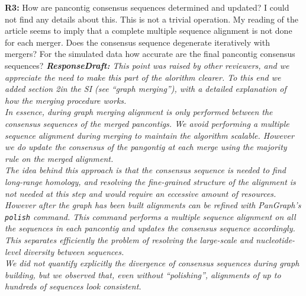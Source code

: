 \documentclass[aps,rmp,onecolumn]{revtex4-1}
\newcommand{\Marco}[1]{{\color{gray}Marco: #1}}
\newcommand{\Liam}[1]{{\color{teal}Liam: #1}}
\newcommand{\reviewer}[2]{\textbf{#1:} #2\vskip 5mm}
\newcommand{\responsedraft}[1]{{\it {\color{purple}\textbf{ResponseDraft:} #1}}\vskip 5mm}
\newcommand{\SIalgo}{2}
\begin{document}
\reviewer{R3}{How are pancontig consensus sequences determined and updated? I could not find any details about this. This is not a trivial operation. My reading of the article seems to imply that a complete multiple sequence alignment is not done for each merger. Does the consensus sequence degenerate iteratively with mergers? For the simulated data how accurate are the final pancontig consensus sequences?}
\responsedraft{This point was raised by other reviewers, and we appreciate the need to make this part of the alorithm clearer. To this end we added section \SIalgo in the SI (see ``graph merging''), with a detailed explanation of how the merging procedure works.\\
      In essence, during graph merging alignment is only performed between the consensus sequences of the merged pancontigs. We avoid performing a multiple sequence alignment during merging to maintain the algorithm scalable. However we do update the consensus of the pangontig at each merge using the majority rule on the merged alignment.\\
      The idea behind this approach is that the consensus sequence is needed to find long-range homology, and resolving the fine-grained structure of the alignment is not needed at this step and would require an eccessive amount of resources. However after the graph has been built alignments can be refined with \textit{PanGraph}'s \texttt{polish} command. This command performs a multiple sequence alignment on all the sequences in each pancontig and updates the consensus sequence accordingly. This separates efficiently the problem of resolving the large-scale and nucleotide-level diversity between sequences.\\
      We did not quantify explicitly the divergence of consensus sequences during graph building, but we observed that, even without ``polishing'', alignments of up to hundreds of sequences look consistent.
}
\end{document}
